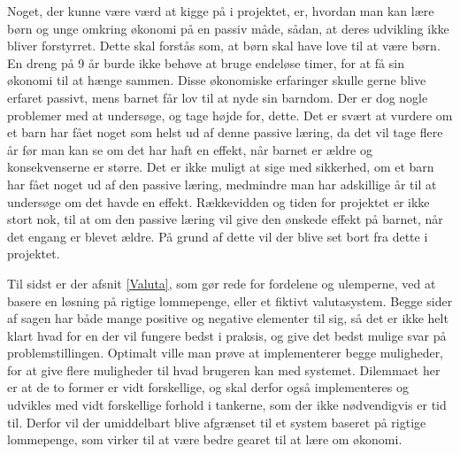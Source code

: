 Noget, der kunne være værd at kigge på i projektet, er, hvordan man kan lære børn og unge omkring økonomi på en passiv måde, sådan, at deres udvikling ikke bliver forstyrret. Dette skal forstås som, at børn skal have love til at være børn. En dreng på 9 år burde ikke behøve at bruge endeløse timer, for at få sin økonomi til at hænge sammen. Disse økonomiske erfaringer skulle gerne blive erfaret passivt, mens barnet får lov til at nyde sin barndom. Der er dog nogle problemer med at undersøge, og tage højde for, dette. Det er svært at vurdere om et barn har fået noget som helst ud af denne passive læring, da det vil tage flere år før man kan se om det har haft en effekt, når barnet er ældre og konsekvenserne er større. Det er ikke muligt at sige med sikkerhed, om et barn har fået noget ud af den passive læring, medmindre man har adskillige år til at undersøge om det havde en effekt. Rækkevidden og tiden for projektet er ikke stort nok, til at om den passive læring vil give den ønskede effekt på barnet, når det engang er blevet ældre. På grund af dette vil der blive set bort fra dette i projektet.

Til sidst er der afsnit \ref{Valuta}, som gør rede for fordelene og ulemperne, ved at basere en løsning på rigtige lommepenge, eller et fiktivt valutasystem. Begge sider af sagen har både mange positive og negative elementer til sig, så det er ikke helt klart hvad for en der vil fungere bedst i praksis, og give det bedst mulige svar på problemstillingen. Optimalt ville man prøve at implementerer begge muligheder, for at give flere muligheder til hvad brugeren kan med systemet. Dilemmaet her er at de to former er vidt forskellige, og skal derfor også implementeres og udvikles med vidt forskellige forhold i tankerne, som der ikke nødvendigvis er tid til. Derfor vil der umiddelbart blive afgrænset til et system baseret på rigtige lommepenge, som virker til at være bedre gearet til at lære om økonomi.